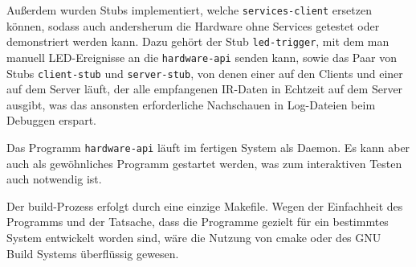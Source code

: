\label{client-stub-und-server-stub}
Außerdem wurden Stubs implementiert, welche \texttt{services-client} ersetzen können, sodass auch
andersherum die Hardware ohne Services getestet oder demonstriert werden kann.
Dazu gehört der Stub \texttt{led-trigger}, mit dem man manuell LED-Ereignisse an die
\texttt{hardware-api} senden kann, sowie das Paar von Stubs \texttt{client-stub} und
\texttt{server-stub}, von denen einer auf den Clients und einer auf dem Server läuft, der alle
empfangenen IR-Daten in Echtzeit auf dem Server ausgibt, was das ansonsten erforderliche
Nachschauen in Log-Dateien beim Debuggen erspart.

Das Programm \texttt{hardware-api} läuft im fertigen System als Daemon.
Es kann aber auch als gewöhnliches Programm gestartet werden, was zum interaktiven Testen auch
notwendig ist.

Der build-Prozess erfolgt durch eine einzige Makefile.
Wegen der Einfachheit des Programms und der Tatsache, dass die Programme gezielt für ein bestimmtes
System entwickelt worden sind, wäre die Nutzung von cmake oder des GNU Build Systems überflüssig
gewesen.
